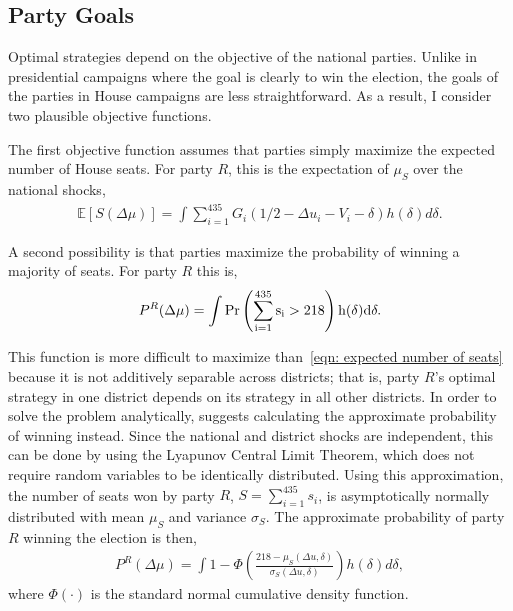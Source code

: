 \documentclass[12pt,final,fleqn]{article}
\theoremstyle{plain}
\newcommand\E{\mathbb{E}}
\begin{document}
\subsection{Party Goals}
Optimal strategies depend on the objective of the national parties. Unlike in presidential campaigns where the goal is clearly to win the election, the goals of the parties in House campaigns are less straightforward. As a result, I consider two plausible objective functions. 

The first objective function assumes that parties simply maximize the expected number of House seats. For party $R$, this is the expectation of $\mu_S$ over the national shocks,
\begin{align} \label{eqn: expected number of seats}
\E\left[S (\Delta \mu)\right] = \int \sum_{i=1}^{435} G_i(1/2 - \Delta u_i - V_i - \delta)h(\delta) d\delta.
\end{align}

A second possibility is that parties maximize the probability of winning a majority of seats. For party $R$ this is,
\begin{align}
P^R(\Delta \mu) = \int \rm{Pr}\left(\sum_{i=1}^{435} s_i > 218 \right) h(\delta)d \delta.
\end{align}

This function is more difficult to maximize than~\autoref{eqn: expected number of seats} because it is not additively separable across districts; that is, party $R$'s optimal strategy in one district depends on its strategy in all other districts. In order to solve the problem analytically, \citet{stromberg2008electoral} suggests calculating the approximate probability of winning instead. Since the national and district shocks are independent, this can be done by using the Lyapunov Central Limit Theorem, which does not require random variables to be identically distributed. Using this approximation, the number of seats won by party $R$, $S=\sum_{i=1}^{435} s_i$, is asymptotically normally distributed with mean $\mu_S$ and variance $\sigma_S$. The approximate probability of party $R$ winning the election is then,
\begin{align}
P^R(\Delta \mu) = \int 1 - \Phi\left(\frac{218 - \mu_S(\Delta u, \delta)}{\sigma_S(\Delta u, \delta)}\right) h(\delta)d\delta,
\end{align}
where $\Phi(\cdot)$ is the standard normal cumulative density function.
\end{document}

